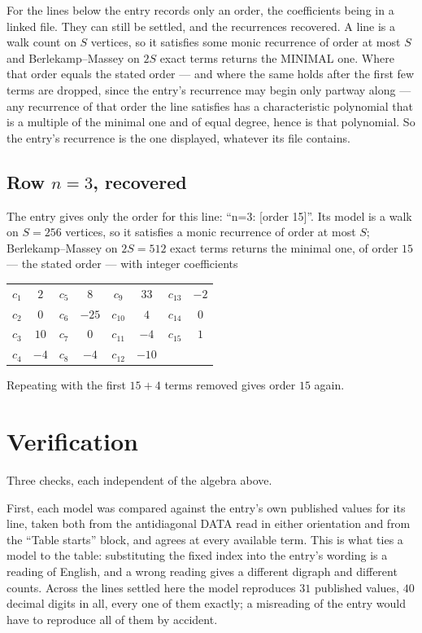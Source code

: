 \documentclass[11pt,a4paper]{article}
\theoremstyle{plain}
\theoremstyle{definition}
\begin{document}
For the lines below the entry records only an order, the coefficients being in a linked file.
They can still be settled, and the recurrences recovered. A line is a walk count on $S$
vertices, so it satisfies some monic recurrence of order at most $S$ and Berlekamp--Massey on
$2S$ exact terms returns the MINIMAL one. Where that order equals the stated order --- and
where the same holds after the first few terms are dropped, since the entry's recurrence may
begin only partway along --- any recurrence of that order the line satisfies has a
characteristic polynomial that is a multiple of the minimal one and of equal degree, hence is
that polynomial. So the entry's recurrence is the one displayed, whatever its file contains.

\subsection*{Row $n=3$, recovered}
The entry gives only the order for this line: ``n=3: [order 15]''. Its model is a walk on
$S=256$ vertices, so it satisfies a monic recurrence of order at most $S$;
Berlekamp--Massey on $2S=512$ exact terms returns the minimal one, of order
$15$ --- the stated order --- with integer coefficients
\begin{center}\small\begin{tabular}{cccccccc}
$c_{1}$ & $2$ & $c_{5}$ & $8$ & $c_{9}$ & $33$ & $c_{13}$ & $-2$ \\
$c_{2}$ & $0$ & $c_{6}$ & $-25$ & $c_{10}$ & $4$ & $c_{14}$ & $0$ \\
$c_{3}$ & $10$ & $c_{7}$ & $0$ & $c_{11}$ & $-4$ & $c_{15}$ & $1$ \\
$c_{4}$ & $-4$ & $c_{8}$ & $-4$ & $c_{12}$ & $-10$ &  &  \\
\end{tabular}\end{center}
Repeating with the first $15+4$ terms removed gives order $15$ again.

\section{Verification}

Three checks, each independent of the algebra above.

First, each model was compared against the entry's own published values for its line, taken
both from the antidiagonal DATA read in either orientation and from the ``Table starts''
block, and agrees at every available term. This is what ties a model to the table:
substituting the fixed index into the entry's wording is a reading of English, and a wrong
reading gives a different digraph and different counts. Across the lines settled here the
model reproduces $31$ published values, $40$ decimal digits in all, every one of
them exactly; a misreading of the entry would have to reproduce all of them by accident.
\end{document}
